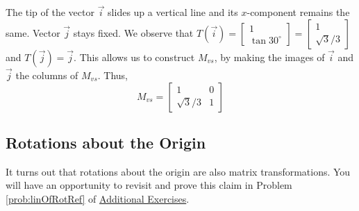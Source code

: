 \documentclass{ximera}
\begin{document}
\begin{example}
\begin{explanation}
\begin{center}
   \quad\quad
{}
\end{center}

The tip of the vector $\vec{i}$ slides up a vertical line and its $x$-component remains the same.  Vector $\vec{j}$ stays fixed.  We observe that $T(\vec{i})=\begin{bmatrix}
1 \\
\tan 30^{\circ}
\end{bmatrix}=\begin{bmatrix}
1 \\
\sqrt{3}/3
\end{bmatrix}$ and $T(\vec{j})=\vec{j}$.  This allows us to construct $M_{vs}$, by making the images of $\vec{i}$ and $\vec{j}$ the columns of $M_{vs}$.  Thus, 
$$M_{vs}=\begin{bmatrix}
1 & 0\\
\sqrt{3}/3 & 1
\end{bmatrix}$$
\end{explanation}
\end{example}



\subsection*{Rotations about the Origin}
It turns out that rotations about the origin are also matrix transformations.  You will have an opportunity to revisit and prove this claim in Problem \ref{prob:linOfRotRef} of \href{\xmbaseurl/SUPX-0060/main}{Additional Exercises}.
\end{document}
